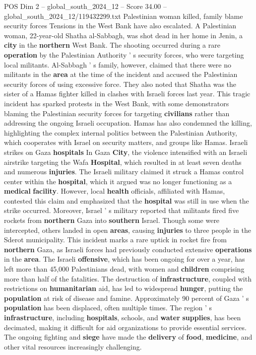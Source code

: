 \begin{textsample}{POS Dim 2 – global\_south\_2024\_12 – Score 34.00 – global\_south\_2024\_12/119432299.txt}
Palestinian woman killed, family blame security forces Tensions in the West Bank have also escalated.
A Palestinian woman, 22-year-old Shatha al-Sabbagh, was shot dead in her home in Jenin, a \textbf{city} in the \textbf{northern} West Bank.
The shooting occurred during a rare \textbf{operation} by the Palestinian Authority ' s security forces, who were targeting local militants.
Al-Sabbagh ' s family, however, claimed that there were no militants in the \textbf{area} at the time of the incident and accused the Palestinian security forces of using excessive force.
They also noted that Shatha was the sister of a Hamas fighter killed in clashes with Israeli forces last year.
This tragic incident has sparked protests in the West Bank, with some demonstrators blaming the Palestinian security forces for targeting \textbf{civilians} rather than addressing the ongoing Israeli occupation.
Hamas has also condemned the killing, highlighting the complex internal politics between the Palestinian Authority, which cooperates with Israel on security matters, and groups like Hamas.
Israeli strikes on Gaza \textbf{hospitals} In Gaza \textbf{City}, the violence intensified with an Israeli airstrike targeting the Wafa \textbf{Hospital}, which resulted in at least seven deaths and numerous \textbf{injuries}.
The Israeli military claimed it struck a Hamas control center within the \textbf{hospital}, which it argued was no longer functioning as a \textbf{medical} \textbf{facility}.
However, local \textbf{health} officials, affiliated with Hamas, contested this claim and emphasized that the \textbf{hospital} was still in use when the strike occurred.
Moreover, Israel ' s military reported that militants fired five rockets from \textbf{northern} Gaza into \textbf{southern} Israel.
Though some were intercepted, others landed in open \textbf{areas}, causing \textbf{injuries} to three people in the Sderot municipality.
This incident marks a rare uptick in rocket fire from \textbf{northern} Gaza, as Israeli forces had previously conducted extensive \textbf{operations} in the \textbf{area}.
The Israeli \textbf{offensive}, which has been ongoing for over a year, has left more than 45,000 Palestinians dead, with women and \textbf{children} comprising more than half of the fatalities.
The destruction of \textbf{infrastructure}, coupled with restrictions on \textbf{humanitarian} aid, has led to widespread \textbf{hunger}, putting the \textbf{population} at risk of disease and famine.
Approximately 90 percent of Gaza ' s \textbf{population} has been displaced, often multiple times.
The region ' s \textbf{infrastructure}, including \textbf{hospitals}, schools, and \textbf{water} \textbf{supplies}, has been decimated, making it difficult for aid organizations to provide essential services.
The ongoing fighting and \textbf{siege} have made the \textbf{delivery} of \textbf{food}, \textbf{medicine}, and other vital resources increasingly challenging.


\end{textsample}
